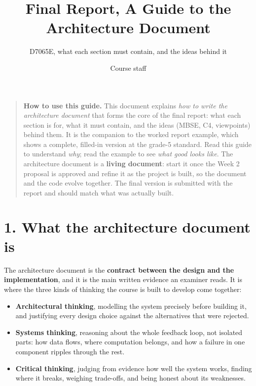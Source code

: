 \documentclass[
  11pt,
]{article}
\title{Final Report, A Guide to the Architecture Document}
\subtitle{D7065E, what each section must contain, and the ideas
behind it}
\author{Course staff}
\date{}
\providecommand{\tightlist}{%
  \setlength{\itemsep}{0pt}\setlength{\parskip}{0pt}}
\begin{document}
\maketitle

{
\hypersetup{linkcolor=black}
\setcounter{tocdepth}{3}
\tableofcontents
}
\begin{quote}
\textbf{How to use this guide.} This document explains \emph{how to
write the architecture document} that forms the core of the final report: what each section is for, what it must contain, and the ideas
(MBSE, C4, viewpoints) behind them. It is the companion to the worked
report example, which shows a complete, filled-in version at the grade-5
standard. Read this guide to understand \emph{why}; read the example to
see \emph{what good looks like}. The architecture document is a
\textbf{living document}: start it once the Week 2 proposal is approved
and refine it as the project is built, so the document and the code evolve
together. The final version is submitted with the report and should
match what was actually built.
\end{quote}

\hypertarget{what-the-architecture-document-is}{%
\section{1. What the architecture document
is}\label{what-the-architecture-document-is}}

The architecture document is the \textbf{contract between the design and the implementation}, and it is the main written evidence an
examiner reads. It is where the three kinds of thinking the course is built to develop come together:

\begin{itemize}
\tightlist
\item
  \textbf{Architectural thinking}, modelling the system precisely
  before building it, and justifying every design choice against the alternatives that were rejected.
\item
  \textbf{Systems thinking}, reasoning about the whole feedback loop,
  not isolated parts: how data flows, where computation belongs, and how
  a failure in one component ripples through the rest.
\item
  \textbf{Critical thinking}, judging from evidence how well the
  system works, finding where it breaks, weighing trade-offs, and being
  honest about its weaknesses.
\end{itemize}
\end{document}
